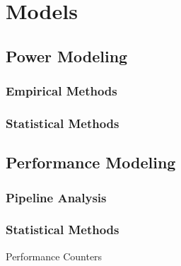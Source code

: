 \section{Models}
\subsection{Power Modeling}
\label{section:powermodels}
\subsubsection{Empirical Methods}
\subsubsection{Statistical Methods}

\subsection{Performance Modeling}
\label{section:powermodels}
\subsubsection{Pipeline Analysis}
\subsubsection{Statistical Methods}
Performance Counters

